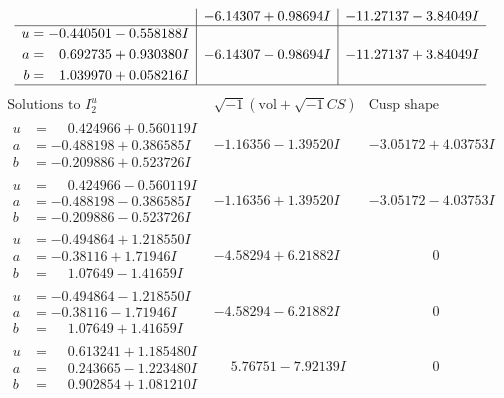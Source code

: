 \documentclass[1p]{elsarticle_modified}
\theoremstyle{definition}
\newcommand{\I}{\sqrt{-1}}
\begin{document}
$$\begin{array}{c|c|c}
 & -6.14307 + 0.98694 I & -11.27137 - 3.84049 I \\ \hline\begin{aligned}
u &= -0.440501 - 0.558188 I \\
a &= \phantom{-}0.692735 + 0.930380 I \\
b &= \phantom{-}1.039970 + 0.058216 I\end{aligned}
 & -6.14307 - 0.98694 I & -11.27137 + 3.84049 I\\
 \hline 
 \end{array}$$\newpage$$\begin{array}{c|c|c}  
\text{Solutions to }I^u_{2}& \I (\text{vol} + \sqrt{-1}CS) & \text{Cusp shape}\\
 \hline 
\begin{aligned}
u &= \phantom{-}0.424966 + 0.560119 I \\
a &= -0.488198 + 0.386585 I \\
b &= -0.209886 + 0.523726 I\end{aligned}
 & -1.16356 - 1.39520 I & -3.05172 + 4.03753 I \\ \hline\begin{aligned}
u &= \phantom{-}0.424966 - 0.560119 I \\
a &= -0.488198 - 0.386585 I \\
b &= -0.209886 - 0.523726 I\end{aligned}
 & -1.16356 + 1.39520 I & -3.05172 - 4.03753 I \\ \hline\begin{aligned}
u &= -0.494864 + 1.218550 I \\
a &= -0.38116 + 1.71946 I \\
b &= \phantom{-}1.07649 - 1.41659 I\end{aligned}
 & -4.58294 + 6.21882 I & \phantom{-0.000000 } 0 \\ \hline\begin{aligned}
u &= -0.494864 - 1.218550 I \\
a &= -0.38116 - 1.71946 I \\
b &= \phantom{-}1.07649 + 1.41659 I\end{aligned}
 & -4.58294 - 6.21882 I & \phantom{-0.000000 } 0 \\ \hline\begin{aligned}
u &= \phantom{-}0.613241 + 1.185480 I \\
a &= \phantom{-}0.243665 - 1.223480 I \\
b &= \phantom{-}0.902854 + 1.081210 I\end{aligned}
 & \phantom{-}5.76751 - 7.92139 I & \phantom{-0.000000 } 0 \\ \hline\begin{aligned}

\end{aligned}
\end{array}$$
\end{document}
